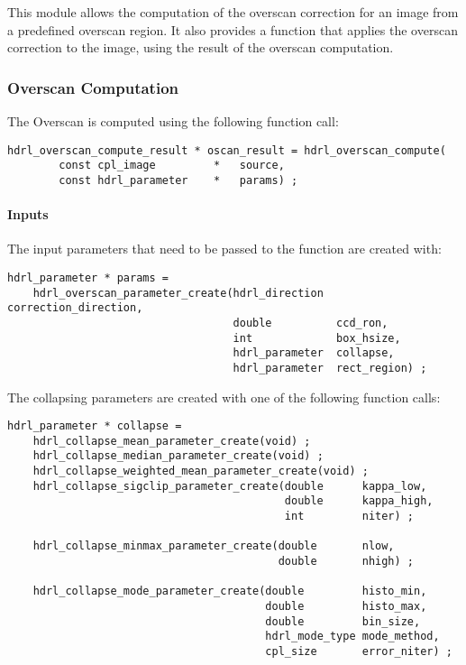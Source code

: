 This module allows the computation of the overscan correction for an image 
from a predefined overscan region. It also provides a function that applies 
the overscan correction to the image, using the result of the overscan 
computation.

\subsubsection{Overscan Computation}
\label{overscan:computation}

The Overscan is computed using the following function call:

\begin{lstlisting}
hdrl_overscan_compute_result * oscan_result = hdrl_overscan_compute(
        const cpl_image         *   source,
        const hdrl_parameter    *   params) ;
\end{lstlisting}

\paragraph{Inputs}

The input parameters that need to be passed to the function are created with:

\begin{lstlisting}
hdrl_parameter * params = 
    hdrl_overscan_parameter_create(hdrl_direction  correction_direction,
                                   double          ccd_ron,
                                   int             box_hsize,
                                   hdrl_parameter  collapse,
                                   hdrl_parameter  rect_region) ;
\end{lstlisting}

The collapsing parameters are created with one of the following function calls:

\begin{lstlisting}
hdrl_parameter * collapse = 
    hdrl_collapse_mean_parameter_create(void) ;
    hdrl_collapse_median_parameter_create(void) ;
    hdrl_collapse_weighted_mean_parameter_create(void) ;
    hdrl_collapse_sigclip_parameter_create(double      kappa_low,
                                           double      kappa_high,
                                           int         niter) ;
                                           
    hdrl_collapse_minmax_parameter_create(double       nlow,
                                          double       nhigh) ;
    
    hdrl_collapse_mode_parameter_create(double         histo_min,
                                        double         histo_max,
                                        double         bin_size,
                                        hdrl_mode_type mode_method,
                                        cpl_size       error_niter) ;
\end{lstlisting}

